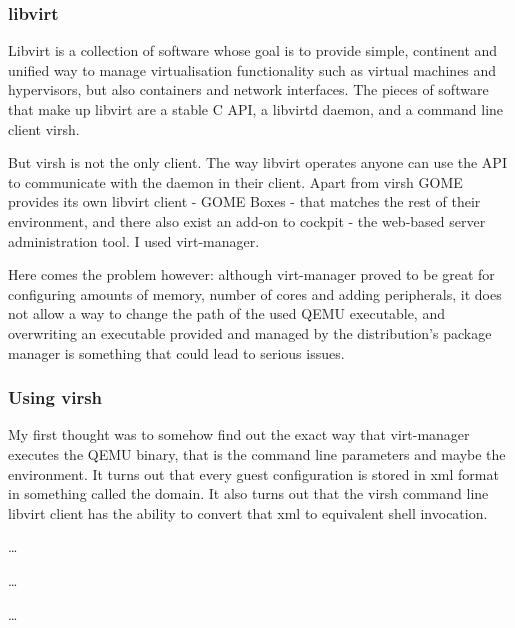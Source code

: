 \subsubsection{libvirt}


Libvirt is a collection of software whose goal is to provide simple, continent
and unified way to manage virtualisation functionality such as virtual machines
and hypervisors, but also containers and network interfaces.  The pieces of
software that make up libvirt are a stable C API, a libvirtd daemon, and
a command line client virsh.

But virsh is not the only client.  The way libvirt operates anyone can use the
API to communicate with the daemon in their client.  Apart from virsh GOME
provides its own libvirt client - GOME Boxes - that matches the rest of their
environment, and there also exist an add-on to cockpit - the web-based server
administration tool.  I used virt-manager.

Here comes the problem however: although virt-manager proved to be great for
configuring amounts of memory, number of cores and adding peripherals, it does
not allow a way to change the path of the used QEMU executable, and overwriting
an executable provided and managed by the distribution's package manager is
something that could lead to serious issues.

\subsubsection{Using virsh}


My first thought was to somehow find out the exact way that virt-manager
executes the QEMU binary, that is the command line parameters and maybe the
environment.  It turns out that every guest configuration is stored in xml
format in something called the domain.  It also turns out that the virsh command
line libvirt client has the ability to convert that xml to equivalent shell
invocation.

\begin{codeblock}
    \dots
    
    \dots
    
    \dots
    
\end{codeblock}

